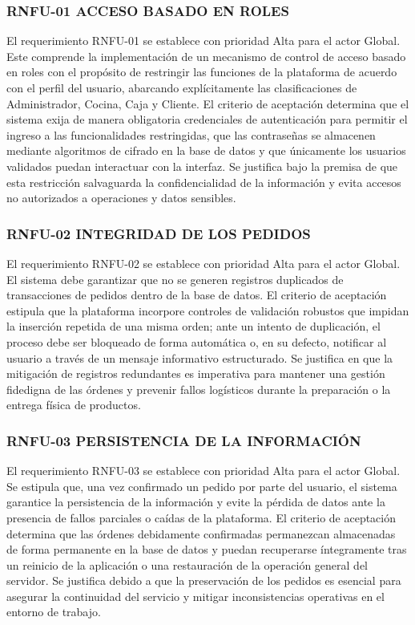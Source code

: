 \subsubsection{RNFU-01 ACCESO BASADO EN ROLES}
El requerimiento RNFU-01 se establece con prioridad Alta para el actor Global. Este comprende la implementación de un mecanismo de control de acceso basado en roles con el propósito de restringir las funciones de la plataforma de acuerdo con el perfil del usuario, abarcando explícitamente las clasificaciones de Administrador, Cocina, Caja y Cliente. El criterio de aceptación determina que el sistema exija de manera obligatoria credenciales de autenticación para permitir el ingreso a las funcionalidades restringidas, que las contraseñas se almacenen mediante algoritmos de cifrado en la base de datos y que únicamente los usuarios validados puedan interactuar con la interfaz. Se justifica bajo la premisa de que esta restricción salvaguarda la confidencialidad de la información y evita accesos no autorizados a operaciones y datos sensibles.

\subsubsection{RNFU-02 INTEGRIDAD DE LOS PEDIDOS}
El requerimiento RNFU-02 se establece con prioridad Alta para el actor Global. El sistema debe garantizar que no se generen registros duplicados de transacciones de pedidos dentro de la base de datos. El criterio de aceptación estipula que la plataforma incorpore controles de validación robustos que impidan la inserción repetida de una misma orden; ante un intento de duplicación, el proceso debe ser bloqueado de forma automática o, en su defecto, notificar al usuario a través de un mensaje informativo estructurado. Se justifica en que la mitigación de registros redundantes es imperativa para mantener una gestión fidedigna de las órdenes y prevenir fallos logísticos durante la preparación o la entrega física de productos.

\subsubsection{RNFU-03 PERSISTENCIA DE LA INFORMACIÓN}
El requerimiento RNFU-03 se establece con prioridad Alta para el actor Global. Se estipula que, una vez confirmado un pedido por parte del usuario, el sistema garantice la persistencia de la información y evite la pérdida de datos ante la presencia de fallos parciales o caídas de la plataforma. El criterio de aceptación determina que las órdenes debidamente confirmadas permanezcan almacenadas de forma permanente en la base de datos y puedan recuperarse íntegramente tras un reinicio de la aplicación o una restauración de la operación general del servidor. Se justifica debido a que la preservación de los pedidos es esencial para asegurar la continuidad del servicio y mitigar inconsistencias operativas en el entorno de trabajo.

